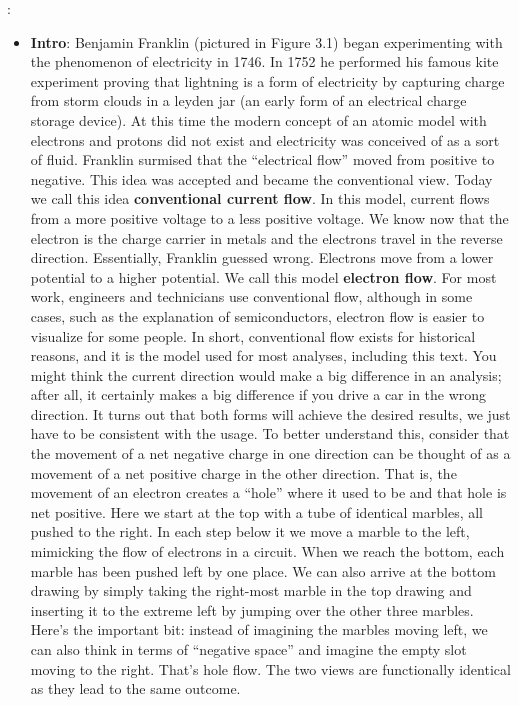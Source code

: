 \documentclass{report}
\begin{document}
    \pagebreak 
    : 
    \begin{itemize}
        \item \textbf{Intro}: Benjamin Franklin (pictured in Figure 3.1) began experimenting with the phenomenon of electricity in 1746. In 1752 he performed his famous kite experiment proving that lightning is a form of electricity by capturing charge from storm clouds in a leyden jar (an early form of an electrical charge storage device). 
            \bigbreak \noindent 
            At this time the modern concept of an atomic model with electrons and protons did not exist and electricity was conceived of as a sort of fluid. Franklin surmised that the “electrical flow” moved from positive to negative. This idea was accepted and became the conventional view. Today we call this idea \textbf{conventional current flow}. In this model, current flows from a more positive voltage to a less positive voltage. We know now that the electron is the charge carrier in metals and the electrons travel in the reverse direction. Essentially, Franklin guessed wrong. Electrons move from a lower potential to a higher potential. We call this model \textbf{electron flow}. For most work, engineers and technicians use conventional flow, although in some cases, such as the explanation of semiconductors, electron flow is easier to visualize for some people. In short, conventional flow exists for historical reasons, and it is the model used for most analyses, including this text.
            \bigbreak \noindent 
            You might think the current direction would make a big difference in an analysis; after all, it certainly makes a big difference if you drive a car in the wrong direction. It turns out that both forms will achieve the desired results, we just have to be consistent with the usage.
            \bigbreak \noindent 
            To better understand this, consider that the movement of a net negative charge in one direction can be thought of as a movement of a net positive charge in the other direction. That is, the movement of an electron creates a “hole” where it used to be and that hole is net positive.
            \bigbreak \noindent 
            \bigbreak \noindent 
            Here we start at the top with a tube of identical marbles, all pushed to the right. In each step below it we move a marble to the left, mimicking the flow of electrons in a circuit. When we reach the bottom, each marble has been pushed left by one place. We can also arrive at the bottom drawing by simply taking the right-most marble in the top drawing and inserting it to the extreme left by jumping over the other three marbles. Here's the important bit: instead of imagining the marbles moving left, we can also think in terms of “negative space” and imagine the empty slot moving to the right. That's hole flow. The two views are functionally identical as they lead to the same outcome.

\end{itemize}
\end{document}
